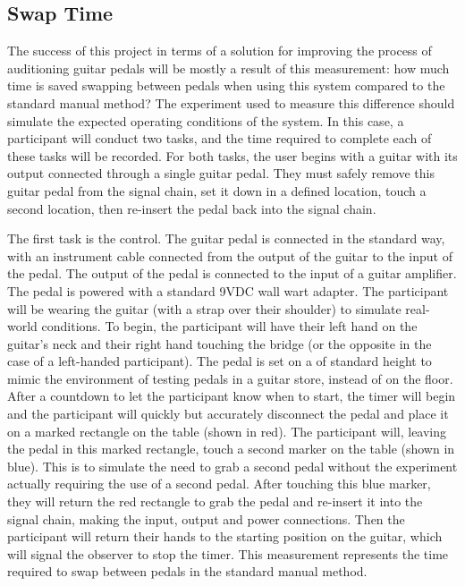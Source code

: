 \documentclass{article}
\begin{document}
	\subsection{Swap Time}
	The success of this project in terms of a solution for improving the process of auditioning guitar pedals will be mostly a result of this measurement: how much time is saved swapping between pedals when using this system compared to the standard manual method?  The experiment used to measure this difference should simulate the expected operating conditions of the system.  In this case, a participant will conduct two tasks, and the time required to complete each of these tasks will be recorded.  For both tasks, the user begins with a guitar with its output connected through a single guitar pedal.  They must safely remove this guitar pedal from the signal chain, set it down in a defined location, touch a second location, then re-insert the pedal back into the signal chain.

	The first task is the control.  The guitar pedal is connected in the standard way, with an instrument cable connected from the output of the guitar to the input of the pedal.  The output of the pedal is connected to the input of a guitar amplifier.  The pedal is powered with a standard 9VDC wall wart adapter. The participant will be wearing the guitar (with a strap over their shoulder) to simulate real-world conditions.  To begin, the participant will have their left hand on the guitar's neck and their right hand touching the bridge (or the opposite in the case of a left-handed participant).  The pedal is set on a of standard height to mimic the environment of testing pedals in a guitar store, instead of on the floor.  After a countdown to let the participant know when to start, the timer will begin and the participant will quickly but accurately disconnect the pedal and place it on a marked rectangle on the table (shown in red).  The participant will, leaving the pedal in this marked rectangle, touch a second marker on the table (shown in blue).  This is to simulate the need to grab a second pedal without the experiment actually requiring the use of a second pedal.  After touching this blue marker, they will return the red rectangle to grab the pedal and re-insert it into the signal chain, making the input, output and power connections.  Then the participant will return their hands to the starting position on the guitar, which will signal the observer to stop the timer.  This measurement represents the time required to swap between pedals in the standard manual method.
\end{document}
